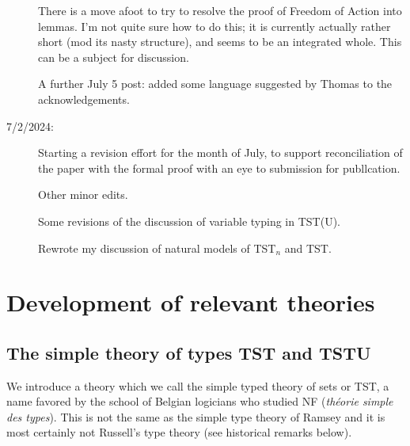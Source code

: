 \documentclass[112pt]{article}
\theoremstyle{definition}
\theoremstyle{remark}
\newenvironment{annot}{\begin{center}\color{blue}\sl}{\end{center}}
\begin{document}
\begin{description}
There is a move afoot to try to resolve the proof of Freedom of Action into lemmas.  I'm not quite sure how to do this;  it is currently actually rather short (mod its nasty structure), and seems to be an integrated whole.  This can be a subject for discussion.

A further July 5 post: added some language suggested by Thomas to the acknowledgements.

\item[7/2/2024:]  Starting a revision effort for the month of July, to support reconciliation of the paper with the formal proof with an eye to submission for publlcation.



Other minor edits.

Some revisions of the discussion of variable typing in TST(U).

Rewrote my discussion of natural models of TST$_n$ and TST.















\end{description}


\newpage

\section{Development of relevant theories}



\subsection{The simple theory of types TST and TSTU}

We introduce a theory which we call the simple typed theory of sets or TST, a name favored by the school of Belgian logicians who studied NF ({\em th\'eorie simple des types}).  This is not the same as the simple type theory of Ramsey and it is most certainly not Russell's type theory  (see historical remarks below).

\begin{comment}
\begin{annot}
  Canonicalise uses of `first order' vs.\ `first order'; `typed theory' vs.\ `type theory'; `well-formed' vs.\ `well-formed'; `Freedom of Action' vs.\ `Freedom of Action'; `NF' vs.\ `NF'; {\tt \textbackslash em} vs. double quotes for introducing definitions.

Holmes:  simple typed theory of sets is simply a consistent rhetorical usage of mine.

The others I am standardizing.

\end{annot}
\end{comment}
\end{document}
